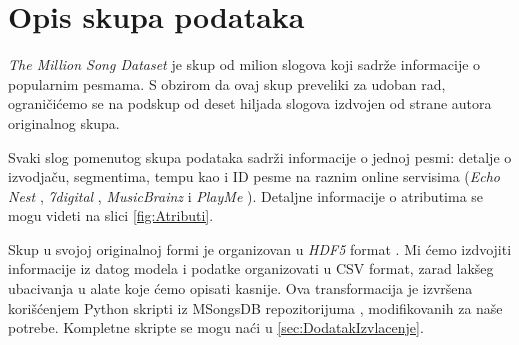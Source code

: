 \section{Opis skupa podataka}
\label{sec:Opis skupa podataka}

\emph{The Million Song Dataset} \cite{Dataset} je skup od milion slogova koji sadr\v{z}e informacije o popularnim pesmama. S obzirom da ovaj skup preveliki za udoban rad, ograni\v{c}i\'c{}emo se na podskup od deset hiljada slogova izdvojen od strane autora originalnog skupa.

Svaki slog pomenutog skupa podataka sadr\v{z}i informacije o jednoj pesmi: detalje o izvodja\v{c}u, segmentima, tempu kao i ID pesme na raznim online servisima (\emph{Echo Nest} \cite{EchoNest}, \emph{7digital} \cite{7digital},  \emph{MusicBrainz} \cite{MusicBrainz} i \emph{PlayMe} \cite{PlayMe}). Detaljne informacije o atributima se mogu videti na slici \ref{fig:Atributi}.

Skup u svojoj originalnoj formi je organizovan u \emph{HDF5} format \cite{HDF5}. Mi \'c{}emo izdvojiti informacije iz datog modela i podatke organizovati u CSV format, zarad lak\v{s}eg ubacivanja u alate koje \'c{}emo opisati kasnije. Ova transformacija je izvr\v{s}ena kori\v{s}\'c{}enjem Python skripti iz MSongsDB repozitorijuma \cite{MSongsDB}, modifikovanih za na\v{s}e potrebe. Kompletne skripte se mogu na\'c{}i u \ref{sec:DodatakIzvlacenje}.
